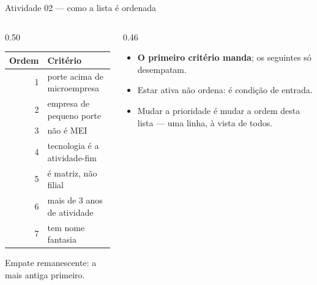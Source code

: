 \documentclass[aspectratio=169]{beamer}
\begin{document}
\begin{frame}{Atividade 02 --- como a lista é ordenada}
    \begin{columns}[T]
        \begin{column}{0.50\textwidth}
            \begin{table}
                \footnotesize
                \begin{tabular}{rl}
                    \toprule
                    Ordem & Critério \\
                    \midrule
                    1 & porte acima de microempresa \\
                    2 & empresa de pequeno porte \\
                    3 & não é MEI \\
                    4 & tecnologia é a atividade-fim \\
                    5 & é matriz, não filial \\
                    6 & mais de 3 anos de atividade \\
                    7 & tem nome fantasia \\
                    \bottomrule
                \end{tabular}
            \end{table}
            \footnotesize
            Empate remanescente: a mais antiga primeiro.
        \end{column}
        \begin{column}{0.46\textwidth}
            \begin{itemize}
                \item \textbf{O primeiro critério manda}; os seguintes só
                      desempatam.
                \item Estar ativa não ordena: é condição de entrada.
                \item Mudar a prioridade é mudar a ordem desta lista --- uma
                      linha, à vista de todos.
            \end{itemize}
        \end{column}
    \end{columns}
\end{frame}
\end{document}

